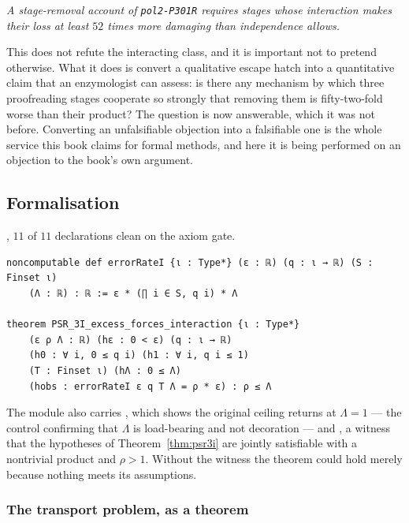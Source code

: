 \begin{center}
\emph{A stage-removal account of \texttt{pol2-P301R} requires stages whose
interaction makes their loss at least $52$ times more damaging than independence
allows.}
\end{center}

This does not refute the interacting class, and it is important not to pretend
otherwise. What it does is convert a qualitative escape hatch into a
quantitative claim that an enzymologist can assess: is there any mechanism by
which three proofreading stages cooperate so strongly that removing them is
fifty-two-fold worse than their product? The question is now answerable, which it
was not before. Converting an unfalsifiable objection into a falsifiable one is
the whole service this book claims for formal methods, and here it is being
performed on an objection to the book's own argument.

\subsection{Formalisation}

, $11$ of $11$ declarations
clean on the axiom gate.

\begin{lstlisting}
noncomputable def errorRateI {ι : Type*} (ε : ℝ) (q : ι → ℝ) (S : Finset ι)
    (Λ : ℝ) : ℝ := ε * (∏ i ∈ S, q i) * Λ

theorem PSR_3I_excess_forces_interaction {ι : Type*}
    (ε ρ Λ : ℝ) (hε : 0 < ε) (q : ι → ℝ)
    (h0 : ∀ i, 0 ≤ q i) (h1 : ∀ i, q i ≤ 1)
    (T : Finset ι) (hΛ : 0 ≤ Λ)
    (hobs : errorRateI ε q T Λ = ρ * ε) : ρ ≤ Λ
\end{lstlisting}

\noindent
The module also carries , which shows the original
ceiling returns at $\Lambda = 1$ --- the control confirming that $\Lambda$ is
load-bearing and not decoration --- and
, a witness that the hypotheses of
Theorem~\ref{thm:psr3i} are jointly satisfiable with a nontrivial product and
$\rho > 1$. Without the witness the theorem could hold merely because nothing
meets its assumptions.

\subsubsection*{The transport problem, as a theorem}

